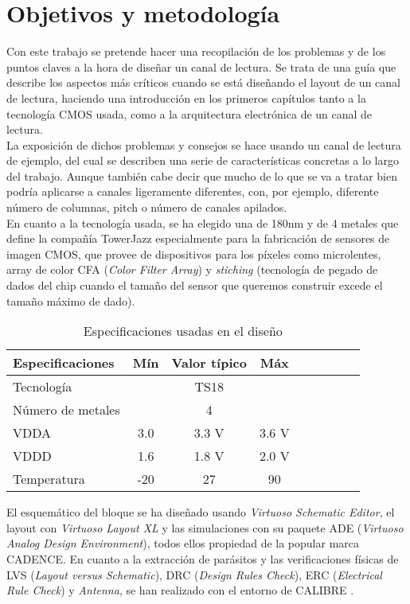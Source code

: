 \chapter*{Objetivos y metodología}
\label{cap:objetivos}

Con este trabajo se pretende hacer una recopilación de los problemas y de los
puntos claves a la hora de diseñar un canal de lectura. Se trata de una guía
que describe los aspectos más críticos cuando se está diseñando el layout de un
canal de lectura, haciendo una introducción en los primeros capítulos tanto a
la tecnología CMOS usada, como a la arquitectura electrónica de un canal de lectura.\\

La exposición de dichos problemas y consejos se hace usando un canal de lectura
de ejemplo, del cual se describen una serie de características concretas a lo
largo del trabajo. Aunque también cabe decir que mucho de lo que se va a tratar
bien podría aplicarse a canales ligeramente diferentes, con, por ejemplo,
diferente número de columnas, pitch o número de canales apilados.\\

En cuanto a la tecnología usada, se ha elegido una de 180nm y de 4 metales que
define la compañía TowerJazz\textsuperscript{\textregistered} especialmente para la fabricación de
sensores de imagen CMOS\cite{TowerJazz}, que provee de dispositivos para los
píxeles como microlentes, array de color CFA (\textit{Color Filter Array}) y \textit{stiching}
(tecnología de pegado de dados del chip cuando el tamaño del sensor que queremos
construir excede el tamaño máximo de dado).\\

\renewcommand{\tablename}{Tabla}

\begin{table}[h]
	\centering
	\caption{Especificaciones usadas en el diseño}
	\label{table:specifications}
	\begin{tabular}{l*{7}{c}r}
		\hline
		Especificaciones	& Mín & Valor típico & Máx \\
		\hline
		Tecnología		&  & TS18 & \\
		Número de metales	&  & 4 & \\
		VDDA			& 3.0 & 3.3 V & 3.6 V \\
		VDDD 			& 1.6 & 1.8 V & 2.0 V \\
		Temperatura		& -20\centigrade & 27\centigrade & 90\centigrade \\
		\hline
	\end{tabular}
\end{table}

El esquemático del bloque se ha diseñado usando \textit{Virtuoso Schematic Editor}\cite{VirtuosoSchematic},
el layout con \textit{Virtuoso Layout XL}\cite{VirtuosoLayoutXL} y las
simulaciones con su paquete ADE (\textit{Virtuoso Analog Design Environment}), todos
ellos propiedad de la popular marca CADENCE\textsuperscript{\textregistered}.
En cuanto a la extracción de parásitos y las verificaciones físicas de LVS
(\textit{Layout versus Schematic}), DRC (\textit{Design Rules Check}), ERC
(\textit{Electrical Rule Check}) y \textit{Antenna}, se han realizado con el entorno
de CALIBRE\textsuperscript{\textregistered} \cite{Calibre}.

